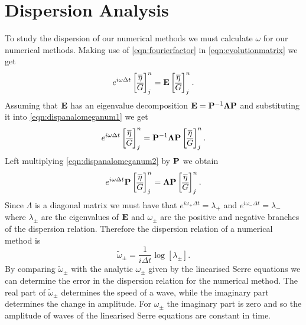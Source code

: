 \section{Dispersion Analysis}
To study the dispersion of our numerical methods we must calculate $\omega$ for our numerical methods. Making use of \eqref{eqn:fourierfactor} in \eqref{eqn:evolutionmatrix} we get 
\begin{equation}
e^{i \omega \Delta t}\begin{bmatrix}
\overline{\eta} \\ \overline{G}
\end{bmatrix}^{n}_j =  \mathbf{E}\begin{bmatrix}
\overline{\eta} \\ \overline{G}
\end{bmatrix}^{n}_j.
\label{eqn:dispanalomeganum1}
\end{equation}
Assuming that $\mathbf{E}$ has an eigenvalue decomposition $\mathbf{E} = \mathbf{P}^{-1} \mathbf{\Lambda} \mathbf{P}$ and substituting it into \eqref{eqn:dispanalomeganum1} we get
\begin{equation}
e^{i \omega \Delta t}\begin{bmatrix}
\overline{\eta} \\ \overline{G}
\end{bmatrix}^{n}_j =  \mathbf{P}^{-1} \mathbf{\Lambda} \mathbf{P}\begin{bmatrix}
\overline{\eta} \\ \overline{G}
\end{bmatrix}^{n}_j.
\label{eqn:dispanalomeganum2}
\end{equation}
Left multiplying \eqref{eqn:dispanalomeganum2} by $\mathbf{P}$ we obtain
\begin{equation}
e^{i \omega \Delta t} \mathbf{P}\begin{bmatrix}
\overline{\eta} \\ \overline{G}
\end{bmatrix}^{n}_j =   \mathbf{\Lambda} \mathbf{P}\begin{bmatrix}
\overline{\eta} \\ \overline{G}
\end{bmatrix}^{n}_j.
\label{eqn:dispanalomeganum3}
\end{equation}
Since $\Lambda$ is a diagonal matrix we must have that $e^{i \omega_+ \Delta t} = \lambda_+$ and $e^{i \omega_- \Delta t} = \lambda_-$ where $\lambda_\pm$ are the eigenvalues of $\mathbf{E}$ and $\omega_\pm$ are the positive and negative branches of the dispersion relation. Therefore the dispersion relation of a numerical method is
\begin{equation}
\widetilde{\omega}_\pm = \frac{1}{i \Delta t} \log\left[ \lambda_\pm\right].
\end{equation}
By comparing $\widetilde{\omega}_\pm$ with the analytic $\omega_\pm$ given by the linearised Serre equations we can determine the error in the dispersion relation for the numerical method. The real part of $\widetilde{\omega}_\pm$ determines the speed of a wave, while the imaginary part determines the change in amplitude. For $\omega_\pm$ the imaginary part is zero and so the amplitude of waves of the linearised Serre equations are constant in time.


